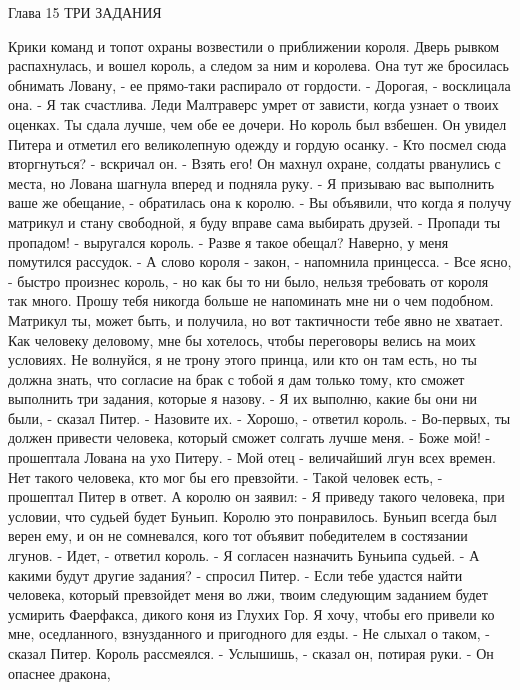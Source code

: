 Глава 15
        ТРИ ЗАДАНИЯ

    Крики команд и топот охраны возвестили о приближении короля. Дверь 
рывком распахнулась, и вошел король, а следом за ним и королева. Она 
тут же бросилась обнимать Ловану, - ее прямо-таки распирало от 
гордости.
    - Дорогая, - восклицала она. - Я так счастлива. Леди Малтраверс 
умрет от зависти, когда узнает о твоих оценках. Ты сдала лучше, чем 
обе ее дочери.
    Но король был взбешен. Он увидел Питера и отметил его великолепную 
одежду и гордую осанку.
    - Кто посмел сюда вторгнуться? - вскричал он. - Взять его!
    Он махнул охране, солдаты рванулись с места, но Лована шагнула 
вперед и подняла руку.
    - Я призываю вас выполнить ваше же обещание, - обратилась она к 
королю. - Вы объявили, что когда я получу матрикул и стану свободной, 
я буду вправе сама выбирать друзей.
    - Пропади ты пропадом! - выругался король. - Разве я такое обещал? 
Наверно, у меня помутился рассудок.
    - А слово короля - закон, - напомнила принцесса.
    - Все ясно, - быстро произнес король, - но как бы то ни было, 
нельзя требовать от короля так много. Прошу тебя никогда больше не 
напоминать мне ни о чем подобном. Матрикул ты, может быть, и получила, 
но вот тактичности тебе явно не хватает. Как человеку деловому, мне бы 
хотелось, чтобы переговоры велись на моих условиях. Не волнуйся, я не 
трону этого принца, или кто он там есть, но ты должна знать, что 
согласие на брак с тобой я дам только тому, кто сможет выполнить три 
задания, которые я назову.
    - Я их выполню, какие бы они ни были, - сказал Питер. - Назовите 
их.
    - Хорошо, - ответил король. - Во-первых, ты должен привести 
человека, который сможет солгать лучше меня.
    - Боже мой! - прошептала Лована на ухо Питеру. - Мой отец - 
величайший лгун всех времен. Нет такого человека, кто мог бы его 
превзойти.
    - Такой человек есть, - прошептал Питер в ответ. А королю он 
заявил: - Я приведу такого человека, при условии, что судьей будет 
Буньип.
    Королю это понравилось. Буньип всегда был верен ему, и он не 
сомневался, кого тот объявит победителем в состязании лгунов.
    - Идет, - ответил король. - Я согласен назначить Буньипа судьей.
    - А какими будут другие задания? - спросил Питер.
    - Если тебе удастся найти человека, который превзойдет меня во 
лжи, твоим следующим заданием будет усмирить Фаерфакса, дикого коня из 
Глухих Гор. Я хочу, чтобы его привели ко мне, оседланного, 
взнузданного и пригодного для езды.
    - Не слыхал о таком, - сказал Питер.
    Король рассмеялся.
    - Услышишь, - сказал он, потирая руки. - Он опаснее дракона, 
